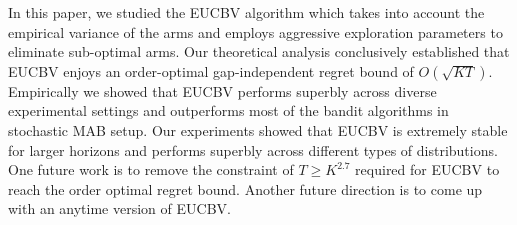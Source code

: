In this paper, we studied the EUCBV algorithm which takes into account the empirical variance of the arms and employs aggressive exploration parameters to eliminate sub-optimal arms. Our theoretical analysis conclusively established that EUCBV enjoys an order-optimal gap-independent regret bound of $O\left(\sqrt{KT}\right)$. Empirically we showed that EUCBV performs superbly across diverse experimental settings and outperforms most of the bandit algorithms in stochastic  MAB setup. Our experiments showed that EUCBV is extremely stable for larger horizons and performs superbly  across different types of distributions. One future work is to remove the constraint of $T\geq K^{2.7}$ required for EUCBV to reach the order optimal regret bound. Another future direction is to come up with an anytime version of EUCBV. 